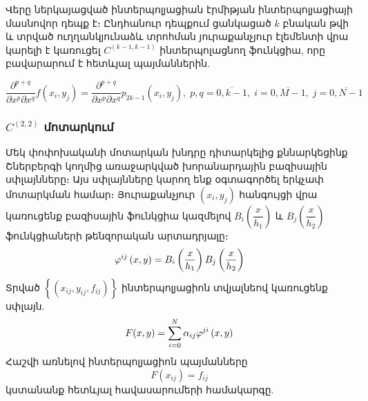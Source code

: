 \documentclass[fleqn, bachelor,subf,12pt,notitlepage]{article}
\begin{document}
Վերը ներկայացված ինտերպոլյացիան էրմիթյան ինտերպոլյացիայի մասնովոր դեպք է։
Ընդհանուր դեպքում ցանկացած $k$ բնական թվի և տրված ուղղանկյունաձև տրոհման յուրաքանչյուր էլեմենտի վրա կարելի է կառուցել $C^{\left(k-1, k-1\right)}$ ինտերպոլացնող ֆունկցիա, որը բավարարում է հետևյալ պայմաններին.

\begin{equation}
\dfrac{\partial^{p+q}}{\partial x^{p} \partial x^{q}}f\left(x_{i}, y_{j}\right)=\dfrac{\partial^{p+q}}{\partial x^{p} \partial x^{q}}p_{2k-1}\left(x_{i}, y_{j}\right), \; p,q=\overline{0, k-1}, \;  i=\overline{0, M-1}, \; j=\overline{0, N-1}
\end{equation}


\newpage
\subsubsection*{$C^{(2,2)}$ մոտարկում}
Մեկ փոփոխականի մոտարկան խնդրը դիտարկելից քննարկեցինք Շներբերգի կողմից առաջարկված խորանարդային բազիսային սփլայնները։ Այս սփլայնները կարող ենք  օգտագործել երկչափ մոտարկման համար։
Յուրաքանչյուր $\left(x_{i}, y_{j}\right)$ հանգույցի վրա կառուցենք բազիսային ֆունկցիա կազմելով $B_{i}\left(\dfrac{x}{h_{1}}\right)$ և $B_{j}\left(\dfrac{x}{h_{2}}\right)$ ֆունկցիաների թենզորական  արտադրյալը։
\begin{equation}
\varphi^{ij}\left(x, y\right) = B_{i}\left(\dfrac{x}{h_{1}}\right) B_{j}\left(\dfrac{x}{h_{2}}\right)$$
\end{equation}
\noindent Տրված $\left\{\left(x_{ij}, y_{ij}, f_{ij}\right)\right\}$ ինտերպոլյացիոն տվյալնեով կառուցենք սփլայն.
\begin{equation}
F(x,y) = \sum_{i=0}^{N} \alpha_{ij}\varphi^{ji}\left(x, y\right)$$
\end{equation}
Հաշվի առնելով ինտերպոլյացիոն պայմանները
\begin{equation*}
F(x_{ij}) = f_{ij}
\end{equation*}
կստանանք հետևյալ հավասարումերի համակարգը.
\end{document}
